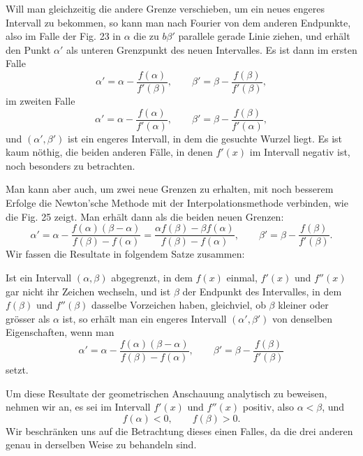 \documentclass[11pt]{article}
\begin{document}
Will man gleichzeitig die andere Grenze verschieben, um ein neues engeres Intervall zu bekommen, so kann man nach Fourier von dem anderen Endpunkte, also im Falle der Fig. 23 in $\alpha$ die zu $b\beta'$ parallele gerade Linie ziehen, und erhält den Punkt $\alpha'$ als unteren Grenzpunkt des neuen Intervalles. Es ist dann im ersten Falle
\[
        \alpha'=\alpha-\frac{f(\alpha)}{f'(\beta)},\qquad
        \beta'=\beta-\frac{f(\beta)}{f'(\beta)},
\]
im zweiten Falle
\[
        \alpha'=\alpha-\frac{f(\alpha)}{f'(\alpha)},\qquad
        \beta'=\beta-\frac{f(\beta)}{f'(\alpha)},
\]
und $(\alpha',\beta')$ ist ein engeres Intervall, in dem die gesuchte Wurzel liegt. Es ist kaum nöthig, die beiden anderen Fälle, in denen $f'(x)$ im Intervall negativ ist, noch besonders zu betrachten.

\weberfigtwentyfive

Man kann aber auch, um zwei neue Grenzen zu erhalten, mit noch besserem Erfolge die Newton'sche Methode mit der Interpolationsmethode verbinden, wie die Fig. 25 zeigt. Man erhält dann als die beiden neuen Grenzen:
\[
        \alpha'=\alpha-\frac{f(\alpha)(\beta-\alpha)}{f(\beta)-f(\alpha)}
        =\frac{\alpha f(\beta)-\beta f(\alpha)}{f(\beta)-f(\alpha)},
        \qquad
        \beta'=\beta-\frac{f(\beta)}{f'(\beta)}.
\]
Wir fassen die Resultate in folgendem Satze zusammen:

Ist ein Intervall $(\alpha,\beta)$ abgegrenzt, in dem $f(x)$ einmal, $f'(x)$ und $f''(x)$ gar nicht ihr Zeichen wechseln, und ist $\beta$ der Endpunkt des Intervalles, in dem $f(\beta)$ und $f''(\beta)$ dasselbe Vorzeichen haben, gleichviel, ob $\beta$ kleiner oder grösser als $\alpha$ ist, so erhält man ein engeres Intervall $(\alpha',\beta')$ von denselben Eigenschaften, wenn man
\begin{equation}
        \alpha'=\alpha-\frac{f(\alpha)(\beta-\alpha)}{f(\beta)-f(\alpha)},
        \qquad
        \beta'=\beta-\frac{f(\beta)}{f'(\beta)}
\tag{4}
\end{equation}
setzt.

Um diese Resultate der geometrischen Anschauung analytisch zu beweisen, nehmen wir an, es sei im Intervall $f'(x)$ und $f''(x)$ positiv, also $\alpha<\beta$, und
\[
        f(\alpha)<0,\qquad f(\beta)>0.
\]
Wir beschränken uns auf die Betrachtung dieses einen Falles, da die drei anderen genau in derselben Weise zu behandeln sind.
\end{document}
